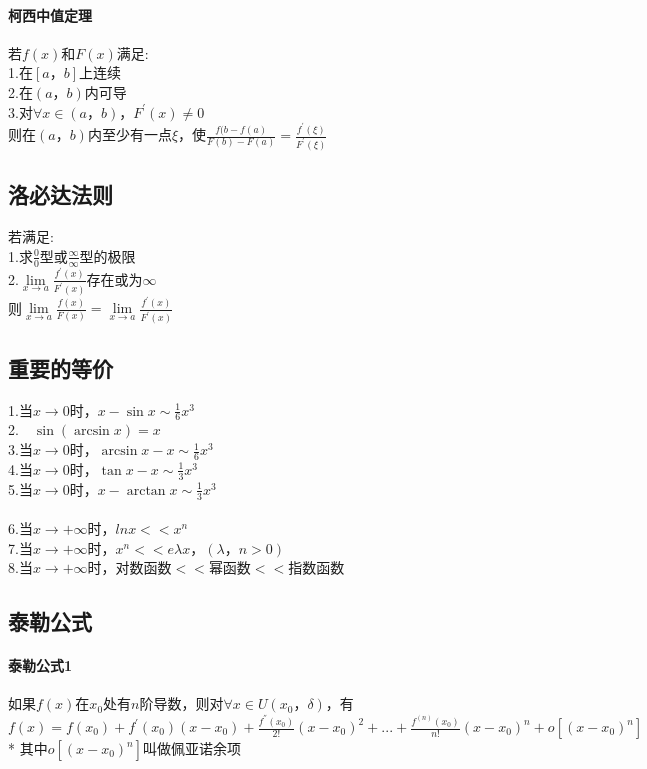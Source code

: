 \documentclass{article}
\begin{document}
\begin{flushleft}
	\paragraph{柯西中值定理}
	若$f(x)$和$F(x)$满足:\\
	1.在$[a，b]$上连续\\
	2.在$(a，b)$内可导\\
	3.对$\forall x\in (a，b)，F^{'}(x)\neq 0$\\
	则在$(a，b)$内至少有一点$\xi$，使$\frac{f(b-f(a)}{F(b)-F(a)}=\frac{f^{'}(\xi)}{F^{'}(\xi)}$\\
	
	\subsection{洛必达法则}
	
	若满足:\\
	1.求$\frac{0}{0}$型或$\frac{\infty}{\infty}$型的极限\\
	2.$\lim\limits_{x\to a}\frac{f^{'}(x)}{F^{'}(x)}$存在或为$\infty$\\
	则$\lim\limits_{x\to a}\frac{f(x)}{F(x)}=\lim\limits_{x\to a}\frac{f^{'}(x)}{F^{'}(x)}$\\
	
	\subsection{重要的等价}
	
	1.当$x\to 0$时，$x-\sin x \sim \frac{1}{6}x^3$\\
	2.\ \ $\sin(\arcsin x)=x$\\
	3.当$x\to 0$时，$\arcsin x-x \sim \frac{1}{6}x^3$\\
	4.当$x\to 0$时，$\tan x-x \sim \frac{1}{3}x^3$\\
	5.当$x\to 0$时，$x-\arctan x \sim \frac{1}{3}x^3$\\
	~\\
	6.当$x\to +\infty$时，$lnx << x^n$\\
	7.当$x\to +\infty$时，$x^n << e{\lambda x}，(\lambda，n>0)$\\
	8.当$x\to +\infty$时，对数函数$<<$幂函数$<<$指数函数\\
	
	\subsection{泰勒公式}
	
	\paragraph{泰勒公式1}
	如果$f(x)$在$x_0$处有$n$阶导数，则对$\forall x \in U(x_0，\delta)$，有$f(x)=f(x_0)+f^{'}(x_0)(x-x_0)+\frac{f^{''}(x_0)}{2!}(x-x_0)^2+...+\frac{f^{(n)}(x_0)}{n!}(x-x_0)^n+o[(x-x_0)^n]$\\
	* 其中$o[(x-x_0)^n]$叫做佩亚诺余项\\
	~\\

\end{flushleft}
\end{document}
